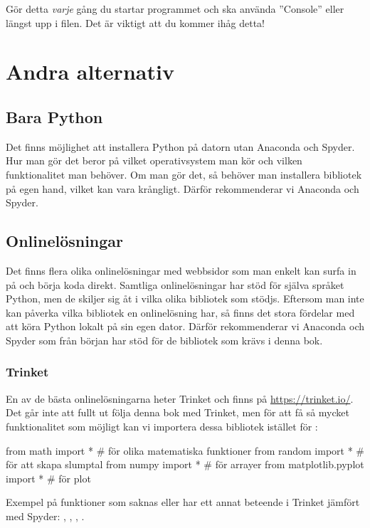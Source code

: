 Gör detta \emph{varje} gång du startar programmet och ska använda ''Console'' eller längst upp i filen. Det är viktigt att du kommer ihåg detta!


\section{Andra alternativ}

\subsection{Bara Python}
Det finns möjlighet att installera Python på datorn utan Anaconda och Spyder. Hur man gör det beror på vilket operativsystem man kör och vilken funktionalitet man behöver. Om man gör det, så behöver man installera bibliotek på egen hand, vilket kan vara krångligt. Därför rekommenderar vi Anaconda och Spyder.

\subsection{Onlinelösningar}
Det finns flera olika onlinelösningar med webbsidor som man enkelt kan surfa in på och börja koda direkt. Samtliga onlinelösningar har stöd för själva språket Python, men de skiljer sig åt i vilka olika bibliotek som stödjs. Eftersom man inte kan påverka vilka bibliotek en onlinelösning har, så finns det stora fördelar med att köra Python lokalt på sin egen dator. Därför rekommenderar vi Anaconda och Spyder som från början har stöd för de bibliotek som krävs i denna bok.

\subsubsection{Trinket}
En av de bästa onlinelösningarna heter Trinket och finns på \url{https://trinket.io/}. Det går inte att fullt ut följa denna bok med Trinket, men för att få så mycket funktionalitet som möjligt kan vi importera dessa bibliotek istället för :

\begin{python}[caption={import på trinket.io},label={}]
from math import * # för olika matematiska funktioner
from random import * # för att skapa slumptal
from numpy import *  # för arrayer
from matplotlib.pyplot import *  # för plot
\end{python}

Exempel på funktioner som saknas eller har ett annat beteende i Trinket jämfört med Spyder: , , , .
